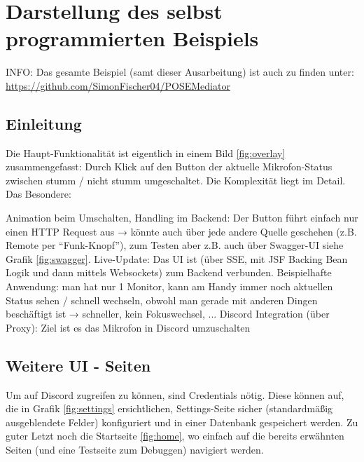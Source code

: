 \chapter{Darstellung des selbst programmierten Beispiels}
INFO: Das gesamte Beispiel (samt dieser Ausarbeitung) ist auch zu finden unter: \url{https://github.com/SimonFischer04/POSEMediator}
\section{Einleitung}
Die Haupt-Funktionalität ist eigentlich in einem Bild \ref{fig:overlay} zusammengefasst: 
Durch Klick auf den Button der aktuelle Mikrofon-Status zwischen stumm / nicht stumm umgeschaltet. Die Komplexität liegt im Detail. Das Besondere: 
\begin{outline}
    \1 Animation beim Umschalten,
    \1 Handling im Backend: Der Button führt einfach nur einen HTTP Request aus → könnte auch über jede andere Quelle geschehen (z.B. Remote per \enquote{Funk-Knopf}), zum Testen aber z.B. auch über Swagger-UI siehe Grafik \ref{fig:swagger}. 
    \1 Live-Update: Das UI ist (über SSE, mit JSF Backing Bean Logik und dann mittels Websockets) zum Backend verbunden. Beispielhafte Anwendung: man hat nur 1 Monitor, kann am Handy immer noch aktuellen Status sehen / schnell wechseln, obwohl man gerade mit anderen Dingen beschäftigt ist → schneller, kein Fokuswechsel, ...
    \1 Discord Integration (über Proxy): Ziel ist es das Mikrofon in Discord umzuschalten
\end{outline}
% 
% 
\section{Weitere UI - Seiten}
Um auf Discord zugreifen zu können, sind Credentials nötig. Diese können auf, die in Grafik \ref{fig:settings} ersichtlichen, Settings-Seite sicher (standardmäßig ausgeblendete Felder) konfiguriert und in einer Datenbank gespeichert werden.
Zu guter Letzt noch die Startseite \ref{fig:home}, wo einfach auf die bereits erwähnten Seiten (und eine Testseite zum Debuggen) navigiert werden.
% 
% 
